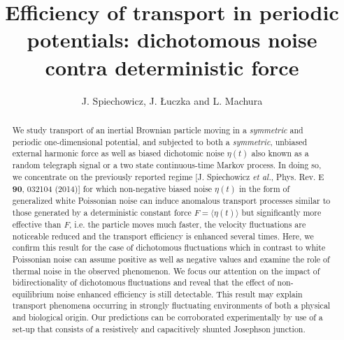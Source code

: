 \documentclass[12pt]{iopart}
\begin{document}
\title[Efficiency of transport in periodic potentials]{Efficiency of transport in periodic potentials:  dichotomous noise contra deterministic force}
\author{J. Spiechowicz,  J. {\L}uczka and L. Machura}
\address{Institute of Physics, University of Silesia, 40-007  Katowice, Poland}
\address{Silesian Center for Education and Interdisciplinary Research,\\ University of Silesia, 41-500 Chorz{\'o}w, Poland}


\begin{abstract}

We study transport of an inertial Brownian particle moving in a \emph{symmetric} and periodic one-dimensional potential,  and subjected to both a \emph{symmetric}, unbiased external harmonic force as well as  biased dichotomic noise $\eta(t)$ also known as a random telegraph signal or a two state continuous-time Markov process. In doing so, we concentrate on the previously reported regime [J. Spiechowicz \textit{et al.}, Phys. Rev. E \textbf{90}, 032104 (2014)] for which non-negative biased noise $\eta(t)$ in the form of generalized white Poissonian noise can induce anomalous transport processes similar to those generated by a deterministic constant force $F=\langle \eta(t) \rangle $ but significantly more effective than $F$, i.e. the particle moves much faster, the velocity fluctuations are noticeable reduced and the transport efficiency is enhanced several times. Here, we confirm this result for the case of dichotomous fluctuations which in contrast to white Poissonian noise can assume positive as well as negative values and examine the role of thermal noise in the observed phenomenon. We focus our attention on the impact of bidirectionality of dichotomous fluctuations and reveal that  the effect of non-equilibrium noise enhanced efficiency is still detectable. This result may explain transport phenomena occurring in strongly fluctuating environments of both a  physical and biological origin. Our predictions can be corroborated experimentally by use of a set-up that consists of a resistively and capacitively shunted Josephson junction.
\end{abstract}


\maketitle
\end{document}
